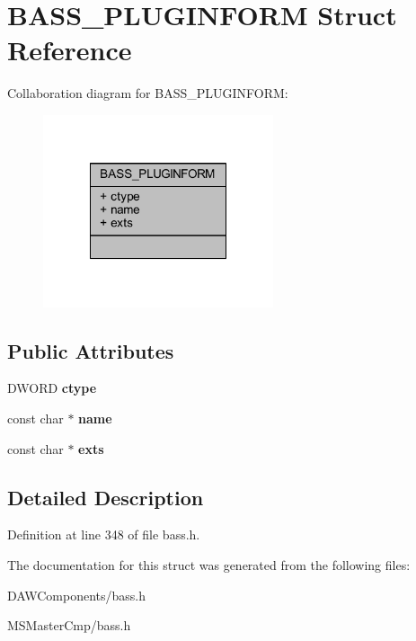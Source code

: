 \hypertarget{struct_b_a_s_s___p_l_u_g_i_n_f_o_r_m}{\section{B\-A\-S\-S\-\_\-\-P\-L\-U\-G\-I\-N\-F\-O\-R\-M Struct Reference}
\label{struct_b_a_s_s___p_l_u_g_i_n_f_o_r_m}
}


Collaboration diagram for B\-A\-S\-S\-\_\-\-P\-L\-U\-G\-I\-N\-F\-O\-R\-M\-:\nopagebreak
\begin{figure}[H]
\begin{center}
\leavevmode
\includegraphics[width=192pt]{struct_b_a_s_s___p_l_u_g_i_n_f_o_r_m__coll__graph}
\end{center}
\end{figure}
\subsection*{Public Attributes}
\begin{DoxyCompactItemize}
\item 
\hypertarget{struct_b_a_s_s___p_l_u_g_i_n_f_o_r_m_a93952bbca5695ff5c9e1bdc8e7271368_a93952bbca5695ff5c9e1bdc8e7271368}{D\-W\-O\-R\-D {\bfseries ctype}}\label{struct_b_a_s_s___p_l_u_g_i_n_f_o_r_m_a93952bbca5695ff5c9e1bdc8e7271368_a93952bbca5695ff5c9e1bdc8e7271368}

\item 
\hypertarget{struct_b_a_s_s___p_l_u_g_i_n_f_o_r_m_a019e8e170022de437a102c9997a15103_a019e8e170022de437a102c9997a15103}{const char $\ast$ {\bfseries name}}\label{struct_b_a_s_s___p_l_u_g_i_n_f_o_r_m_a019e8e170022de437a102c9997a15103_a019e8e170022de437a102c9997a15103}

\item 
\hypertarget{struct_b_a_s_s___p_l_u_g_i_n_f_o_r_m_a9de1247713a7b5fe0ef8d285878e3159_a9de1247713a7b5fe0ef8d285878e3159}{const char $\ast$ {\bfseries exts}}\label{struct_b_a_s_s___p_l_u_g_i_n_f_o_r_m_a9de1247713a7b5fe0ef8d285878e3159_a9de1247713a7b5fe0ef8d285878e3159}

\end{DoxyCompactItemize}


\subsection{Detailed Description}


Definition at line 348 of file bass.\-h.



The documentation for this struct was generated from the following files\-:\begin{DoxyCompactItemize}
\item 
D\-A\-W\-Components/bass.\-h\item 
M\-S\-Master\-Cmp/bass.\-h\end{DoxyCompactItemize}
